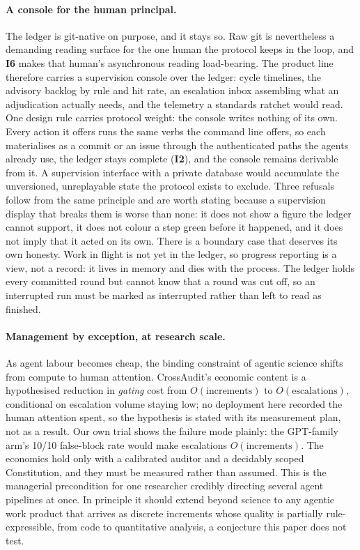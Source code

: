 \documentclass[11pt]{article}
\newcommand{\invariant}[1]{\textbf{I#1}}
\begin{document}
\paragraph{A console for the human principal.} The ledger is git-native on purpose, and it stays so. Raw git is nevertheless a demanding reading surface for the one human the protocol keeps in the loop, and \invariant{6} makes that human's asynchronous reading load-bearing. The product line therefore carries a supervision console over the ledger: cycle timelines, the advisory backlog by rule and hit rate, an escalation inbox assembling what an adjudication actually needs, and the telemetry a standards ratchet would read. One design rule carries protocol weight: the console writes nothing of its own. Every action it offers runs the same verbs the command line offers, so each materialises as a commit or an issue through the authenticated paths the agents already use, the ledger stays complete (\invariant{2}), and the console remains derivable from it. A supervision interface with a private database would accumulate the unversioned, unreplayable state the protocol exists to exclude. Three refusals follow from the same principle and are worth stating because a supervision display that breaks them is worse than none: it does not show a figure the ledger cannot support, it does not colour a step green before it happened, and it does not imply that it acted on its own. There is a boundary case that deserves its own honesty. Work in flight is not yet in the ledger, so progress reporting is a view, not a record: it lives in memory and dies with the process. The ledger holds every committed round but cannot know that a round was cut off, so an interrupted run must be marked as interrupted rather than left to read as finished.

\paragraph{Management by exception, at research scale.} As agent labour becomes cheap, the binding constraint of agentic science shifts from compute to human attention. CrossAudit's economic content is a hypothesised reduction in \emph{gating} cost from $O(\text{increments})$ to $O(\text{escalations})$, conditional on escalation volume staying low; no deployment here recorded the human attention spent, so the hypothesis is stated with its measurement plan, not as a result. Our own trial shows the failure mode plainly: the GPT-family arm's 10/10 false-block rate would make escalations $O(\text{increments})$. The economics hold only with a calibrated auditor and a decidably scoped Constitution, and they must be measured rather than assumed. This is the managerial precondition for one researcher credibly directing several agent pipelines at once. In principle it should extend beyond science to any agentic work product that arrives as discrete increments whose quality is partially rule-expressible, from code to quantitative analysis, a conjecture this paper does not test.
\end{document}
